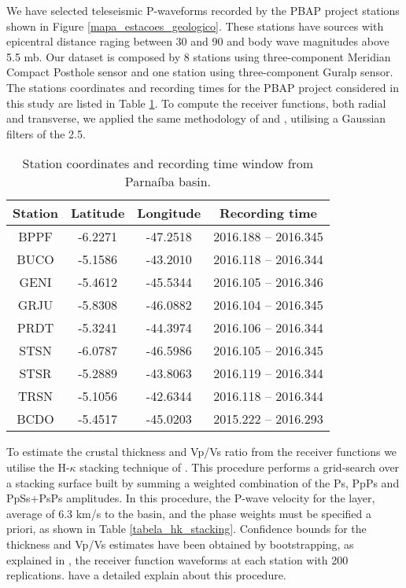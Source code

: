 \documentclass[paper,11pt]{geophysics}
\begin{document}
We have selected teleseismic P-waveforms recorded by the PBAP project stations shown in Figure \ref{mapa_estacoes_geologico}. These stations have sources with epicentral distance raging between 30 and 90 and body wave magnitudes above 5.5 mb. Our dataset is composed by 8  stations using three-component Meridian Compact Posthole sensor and one station using three-component Guralp sensor. The stations coordinates and recording times for the PBAP project considered in this study are listed in Table \ref{tabela_estacoes}. To compute the receiver functions, both radial and transverse, we applied the same methodology of \cite{julia_deep_2008} and \cite{luz_bulk_2015}, utilising a Gaussian filters of the 2.5.

\begin{table}[! htpb]
\centering
	\small
	\begin{threeparttable}
	\caption{Station coordinates and recording time window from Parnaíba basin.}
	\begin{tabular}{c c c c}
    \hline
    Station & Latitude & Longitude & Recording time \\ \hline
    BPPF & -6.2271 & -47.2518 & 2016.188 – 2016.345 \\
	BUCO & -5.1586 & -43.2010 & 2016.118 – 2016.344 \\
	GENI & -5.4612 & -45.5344 & 2016.105 – 2016.346 \\
	GRJU & -5.8308 & -46.0882 & 2016.104 – 2016.345 \\
	PRDT & -5.3241 & -44.3974 & 2016.106 – 2016.344 \\
	STSN & -6.0787 & -46.5986 & 2016.105 – 2016.345 \\
	STSR & -5.2889 & -43.8063 & 2016.119 – 2016.344 \\
	TRSN & -5.1056 & -42.6344 & 2016.118 – 2016.344 \\
	BCDO & -5.4517 & -45.0203 & 2015.222 – 2016.293 \\ \hline
    \end{tabular}
    \label{tabela_estacoes}
	\end{threeparttable}
\end{table}

To estimate the crustal thickness and Vp/Vs ratio from the receiver functions we utilise the H-$\kappa$ stacking technique of \cite{zhu_moho_2000}. This procedure performs a grid-search  over a stacking surface built by summing a weighted combination of the Ps, PpPs and PpSs+PsPs amplitudes. In this procedure, the P-wave velocity for the layer, average of 6.3 km/s to the basin, and the phase weights must be specified a priori, as shown in Table \ref{tabela_hk_stacking}. Confidence  bounds for the thickness and Vp/Vs estimates have been obtained by bootstrapping, as explained in  \cite{efron_statistical_1991}, the receiver function waveforms at each station with 200 replications. \cite{luz_bulk_2015} have a detailed explain about this procedure.
\end{document}
